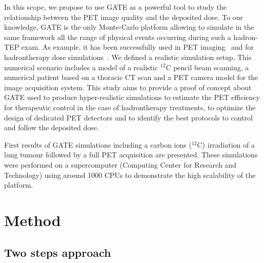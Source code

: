 \documentclass[11pt]{iopart}
\begin{document}
In this scope, we propose to use GATE as a powerful tool to study the
relationship between the PET image quality and the deposited dose. To
our knowledge, GATE is the only Monte-Carlo platform allowing to
simulate in the same framework all the range of physical events
occurring during such a hadron-TEP exam. As example, it has been
successfully used in PET imaging~\cite{Buvat2006a} and for
hadrontherapy dose simulations~\cite{Jan2011, Grevillot2011a}. We
defined a realistic simulation setup. This numerical scenario includes
a model of a realistic $^{12}$C pencil beam scanning, a numerical
patient based on a thoracic CT scan and a PET camera model for the
image acquisition system. This study aims to provide a proof of
concept about GATE used to produce hyper-realistic simulations to
estimate the PET efficiency for therapeutic control in the case of
hadrontherapy treatments, to optimize the design of dedicated PET
detectors and to identify the best protocols to control and follow the
deposited dose.

First results of GATE simulations including a carbon ions ($^{12}$C)
irradiation of a lung tumour followed by a full PET acquisition are
presented. These simulations were performed on a supercomputer
(Computing Center for Research and Technology) using around 1000 CPUs
to demonstrate the high scalability of the platform.

\section{Method}



\subsection{Two steps approach}
\end{document}
